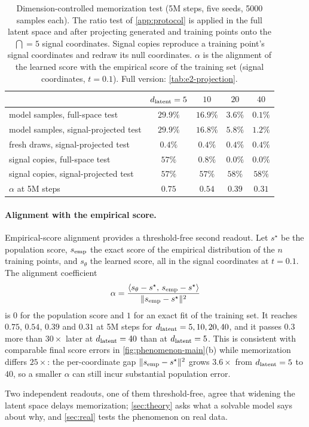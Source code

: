 \begin{table}[t]
  \centering\small
  \caption{Dimension-controlled memorization test (5M steps, five seeds, 5000 samples each). The ratio test of \cref{app:protocol} is applied in the full latent space and after projecting generated and training points onto the $\dint=5$ signal coordinates. Signal copies reproduce a training point's signal coordinates and redraw its null coordinates. $\alpha$ is the alignment of the learned score with the empirical score of the training set (signal coordinates, $t=0.1$). Full version: \cref{tab:e2-projection}.}
  \label{tab:projection-main}
  \begin{tabular}{lcccc}
    \toprule
     & $d_{\mathrm{latent}}=5$ & $10$ & $20$ & $40$\\
    \midrule
    model samples, full-space test & $29.9\%$ & $16.9\%$ & $3.6\%$ & $0.1\%$\\
    model samples, signal-projected test & $29.9\%$ & $16.8\%$ & $5.8\%$ & $1.2\%$\\
    fresh draws, signal-projected test & $0.4\%$ & $0.4\%$ & $0.4\%$ & $0.4\%$\\
    signal copies, full-space test & $57\%$ & $0.8\%$ & $0.0\%$ & $0.0\%$\\
    signal copies, signal-projected test & $57\%$ & $57\%$ & $58\%$ & $58\%$\\
    \midrule
    $\alpha$ at 5M steps & $0.75$ & $0.54$ & $0.39$ & $0.31$\\
    \bottomrule
  \end{tabular}
\end{table}

\paragraph{Alignment with the empirical score.}
Empirical-score alignment provides a threshold-free second readout. Let $s^\star$ be the population score, $s_{\rm emp}$ the exact score of the empirical distribution of the $n$ training points, and $s_\theta$ the learned score, all in the signal coordinates at $t=0.1$. The alignment coefficient
\begin{equation}
  \alpha=\frac{\langle s_\theta-s^\star,\,s_{\rm emp}-s^\star\rangle}{\|s_{\rm emp}-s^\star\|^2}
\end{equation}
is $0$ for the population score and $1$ for an exact fit of the training set. It reaches $0.75$, $0.54$, $0.39$ and $0.31$ at 5M steps for $d_{\mathrm{latent}}=5,10,20,40$, and it passes $0.3$ more than $30\times$ later at $d_{\mathrm{latent}}=40$ than at $d_{\mathrm{latent}}=5$. This is consistent with comparable final score errors in \cref{fig:phenomenon-main}(b) while memorization differs $25\times$: the per-coordinate gap $\|s_{\rm emp}-s^\star\|^2$ grows $3.6\times$ from $d_{\mathrm{latent}}=5$ to $40$, so a smaller $\alpha$ can still incur substantial population error.

Two independent readouts, one of them threshold-free, agree that widening the latent space delays memorization; \cref{sec:theory} asks what a solvable model says about why, and \cref{sec:real} tests the phenomenon on real data.
